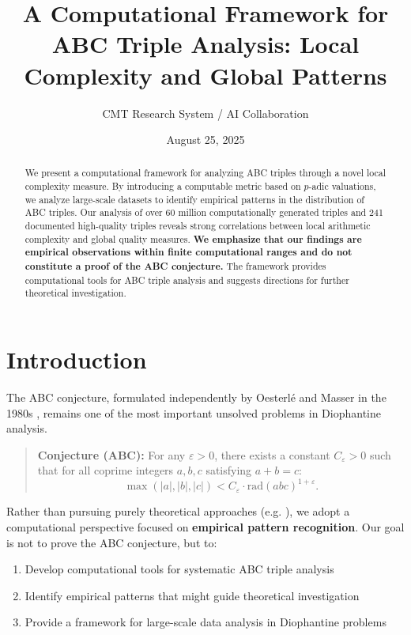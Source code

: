 \documentclass[11pt,a4paper]{article}
\title{A Computational Framework for ABC Triple Analysis: Local Complexity and Global Patterns}
\author{CMT Research System / AI Collaboration}
\date{August 25, 2025}
\begin{document}
\maketitle

\begin{abstract}
We present a computational framework for analyzing ABC triples through a novel local complexity measure. By introducing a computable metric based on $p$-adic valuations, we analyze large-scale datasets to identify empirical patterns in the distribution of ABC triples. Our analysis of over 60 million computationally generated triples and 241 documented high-quality triples reveals strong correlations between local arithmetic complexity and global quality measures. \textbf{We emphasize that our findings are empirical observations within finite computational ranges and do not constitute a proof of the ABC conjecture.} The framework provides computational tools for ABC triple analysis and suggests directions for further theoretical investigation.
\end{abstract}

\section{Introduction}

The ABC conjecture, formulated independently by Oesterlé and Masser in the 1980s \citep{oesterle1988abc,masser1988abc}, remains one of the most important unsolved problems in Diophantine analysis.

\begin{quote}
\textbf{Conjecture (ABC):} For any $\varepsilon > 0$, there exists a constant $C_\varepsilon > 0$ such that for all coprime integers $a, b, c$ satisfying $a+b=c$:
\[
\max(|a|,|b|,|c|) < C_\varepsilon \cdot \text{rad}(abc)^{1+\varepsilon}.
\]
\end{quote}

Rather than pursuing purely theoretical approaches (e.g. \cite{granville1998abc,szpiro1990discriminant,pollack2005}), we adopt a computational perspective focused on \textbf{empirical pattern recognition}. Our goal is not to prove the ABC conjecture, but to:
\begin{enumerate}
    \item Develop computational tools for systematic ABC triple analysis
    \item Identify empirical patterns that might guide theoretical investigation
    \item Provide a framework for large-scale data analysis in Diophantine problems
\end{enumerate}
\end{document}
